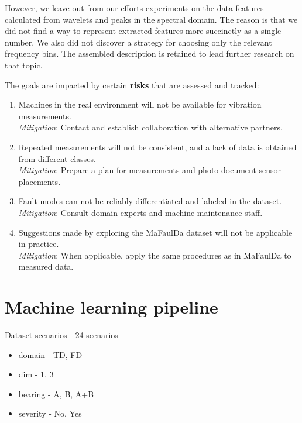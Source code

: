 However, we leave out from our efforts experiments on the data features calculated from wavelets and peaks in the spectral domain. The reason is that we did not find a way to represent extracted features more succinctly as a single number. We also did not discover a strategy for choosing only the relevant frequency bins. The assembled description is retained to lead further research on that topic.

The goals are impacted by certain \textbf{risks} that are assessed and tracked:

\begin{enumerate}[label=R-\arabic*., font=\bfseries]
\itemsep0pt
\item Machines in the real environment will not be available for vibration measurements. \\ \emph{Mitigation}: Contact and establish collaboration with alternative partners. 
\item Repeated measurements will not be consistent, and a lack of data is obtained from different classes.
\\ \emph{Mitigation}: Prepare a plan for measurements and photo document sensor placements. 
\item Fault modes can not be reliably differentiated and labeled in the dataset.
\\ \emph{Mitigation}: Consult domain experts and machine maintenance staff.
\item Suggestions made by exploring the MaFaulDa dataset will not be applicable in practice. \\
\emph{Mitigation}: When applicable, apply the same procedures as in MaFaulDa to measured data.
\end{enumerate}


\section{Machine learning pipeline}

Dataset scenarios - 24 scenarios
\begin{itemize}
\item domain - TD, FD
\item dim - 1, 3
\item bearing - A, B, A+B
\item severity - No, Yes
\end{itemize}


